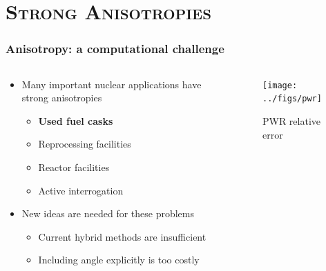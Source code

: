 \documentclass[handout]{beamer}
\renewcommand{\(}{\begin{columns}}
\renewcommand{\)}{\end{columns}}
\newcommand{\<}[1]{\begin{column}{#1}}
\renewcommand{\>}{\end{column}}
\begin{document}
\section{\scshape Strong Anisotropies}
\begin{frame}[fragile]
  \frametitle{Anisotropy: a computational challenge}

	\begin{columns}
  	\begin{column}{0.5\textwidth}
	\begin{itemize}
	\item Many important nuclear applications have strong anisotropies
	 \begin{itemize}
	 \item \textbf{Used fuel casks}
	 \item Reprocessing facilities
	 \item Reactor facilities
	 \item Active interrogation 
	 \end{itemize}
	\pause
	\item New ideas are needed for these problems
	\begin{itemize}
	\item Current hybrid methods are insufficient
	\item Including angle explicitly is too costly	
	\end{itemize}
	\end{itemize}
  	\end{column}
 	\begin{column}{0.5\textwidth}
 	 \begin{center}
 	 \begin{figure}
 	 \texttt{[image: ../figs/pwr]}  
 	 \caption{PWR relative error \cite{Pantelias2013}}
 	 \end{figure}
 	 \end{center}

  	\end{column}
	\end{columns}

\end{frame}
\end{document}

